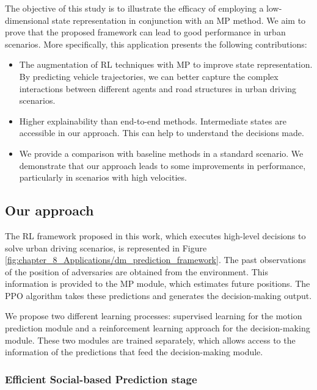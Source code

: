 The objective of this study is to illustrate the efficacy of employing a low-dimensional state representation in conjunction with an MP method. We aim to prove that the proposed framework can lead to good performance in urban scenarios. More specifically, this application presents the following contributions:

\begin{itemize}
	\item The augmentation of RL techniques with MP to improve state representation. By predicting vehicle trajectories, we can better capture the complex interactions between different agents and road structures in urban driving scenarios. 
	
	\item Higher explainability than end-to-end methods. Intermediate states are accessible in our approach. This can help to understand the decisions made.
	
	\item We provide a comparison with baseline methods in a standard scenario. We demonstrate that our approach leads to some improvements in performance, particularly in scenarios with high velocities.
\end{itemize}

\subsection{Our approach}
\label{subsec:8_decision_making_our_approach}

The RL framework proposed in this work, which executes high-level decisions to solve urban driving scenarios, is represented in Figure \ref{fig:chapter_8_Applications/dm_prediction_framework}. The past observations of the position of adversaries are obtained from the environment. This information is provided to the MP module, which estimates future positions. The PPO algorithm takes these predictions and generates the decision-making output.

We propose two different learning processes: supervised learning for the motion prediction module and a reinforcement learning approach for the decision-making module. These two modules are trained separately, which allows access to the information of the predictions that feed the decision-making module.

\subsubsection{Efficient Social-based Prediction stage}
\label{subsubsec:8_decision_making_our_approach_prediction}

